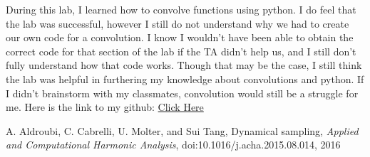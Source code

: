 \documentclass[12pt]{report}
\begin{document}
During this lab, I learned how to convolve functions using python. I do feel that the lab was successful, however I still do not understand why we had to create our own code for a convolution. I know I wouldn't have been able to obtain the correct code for that section of the lab if the TA didn't help us, and I still don't fully understand how that code works. Though that may be the case, I still think the lab was helpful in furthering my knowledge about convolutions and python. If I didn't brainstorm with my classmates, convolution would still be a struggle for me. Here is the link to my github: \href{https://github.com/JMac1999}{Click Here}

\newpage


\begin{thebibliography}{111}

A. Aldroubi, C. Cabrelli, U. Molter, and Sui Tang,
Dynamical sampling, 
{\it  Applied and Computational Harmonic Analysis}, doi:10.1016/j.acha.2015.08.014, 2016


\end{thebibliography}
\end{document}
